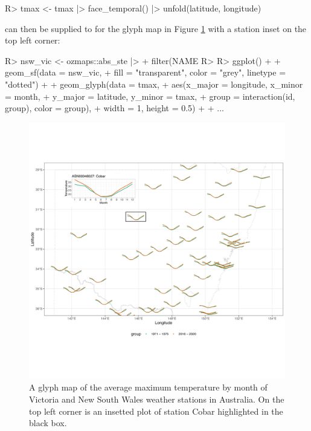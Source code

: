 \documentclass[
]{jss}
\begin{document}
\begin{CodeChunk}
\begin{CodeInput}
R> tmax <- tmax |> face_temporal() |> unfold(latitude, longitude)
\end{CodeInput}
\end{CodeChunk}

 can then be supplied to  for the glyph
map in Figure \ref{fig:basic-manip} with a station inset on the top left
corner:

\begin{CodeChunk}
\begin{CodeInput}
R> nsw_vic <- ozmaps::abs_ste |> 
+   filter(NAME %
R> 
R> ggplot() + 
+   geom_sf(data = nsw_vic, 
+           fill = "transparent", color = "grey", linetype = "dotted") + 
+   geom_glyph(data = tmax, 
+              aes(x_major = longitude, x_minor = month, 
+                  y_major = latitude, y_minor = tmax,
+                  group = interaction(id, group), color = group),
+              width = 1, height = 0.5) +
+   ...
\end{CodeInput}
\end{CodeChunk}

\begin{CodeChunk}
\begin{figure}

{\centering \includegraphics[width=1\linewidth,height=0.7\textheight]{figures/basic-manip} 

}

\caption[A glyph map of the average maximum temperature by month of Victoria and New South Wales weather stations in Australia]{A glyph map of the average maximum temperature by month of Victoria and New South Wales weather stations in Australia. On the top left corner is an insetted plot of station Cobar highlighted in the black box.}\label{fig:basic-manip}
\end{figure}
\end{CodeChunk}
\end{document}
